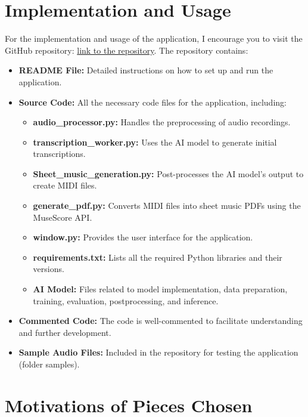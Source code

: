 \documentclass{article}
\begin{document}
\section{Implementation and Usage}

For the implementation and usage of the application, I encourage you to visit the GitHub repository: \href{https://github.com/mj300405/MP3_to_notes}{link to the repository}. The repository contains:
\begin{itemize}
    \item \textbf{README File:} Detailed instructions on how to set up and run the application.
    \item \textbf{Source Code:} All the necessary code files for the application, including:
    \begin{itemize}
        \item \textbf{audio\_processor.py:} Handles the preprocessing of audio recordings.
        \item \textbf{transcription\_worker.py:} Uses the AI model to generate initial transcriptions.
        \item \textbf{Sheet\_music\_generation.py:} Post-processes the AI model's output to create MIDI files.
        \item \textbf{generate\_pdf.py:} Converts MIDI files into sheet music PDFs using the MuseScore API.
        \item \textbf{window.py:} Provides the user interface for the application.
        \item \textbf{requirements.txt:} Lists all the required Python libraries and their versions.
        \item \textbf{AI Model:} Files related to model implementation, data preparation, training, evaluation, postprocessing, and inference.
    \end{itemize}
    \item \textbf{Commented Code:} The code is well-commented to facilitate understanding and further development.
    \item \textbf{Sample Audio Files:} Included in the repository for testing the application (folder samples).
\end{itemize}



\clearpage
\FloatBarrier
\section{Motivations of Pieces Chosen}
\end{document}
